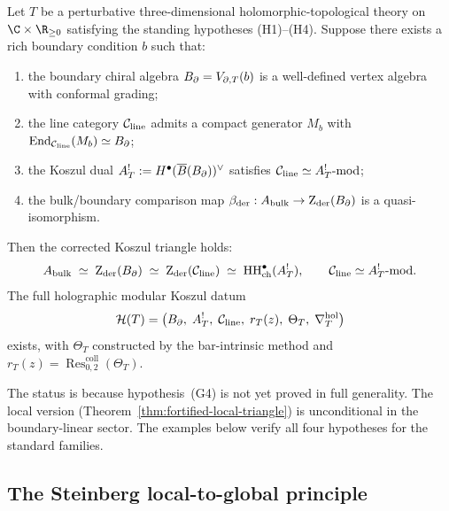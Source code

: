 \begin{conjecture}
Let $T$ be a perturbative three-dimensional holomorphic-topological
theory on $\C\times\R_{\ge 0}$ satisfying the standing hypotheses
\textup{(H1)--(H4)}. Suppose there exists a rich boundary
condition $b$ such that:
\begin{enumerate}[label=\textup{(G\arabic*)},leftmargin=2.2em]
\item the boundary chiral algebra $B_{\partial}=V_{\partial,T}(b)$ is
a well-defined vertex algebra with conformal grading;
\item the line category $\mathcal C_{\mathrm{line}}$ admits a compact
generator $M_b$ with $\operatorname{End}_{\mathcal C_{\mathrm{line}}}(M_b)\simeq B_{\partial}$;
\item the Koszul dual $A^!_T := H^\bullet(\overline{B}(B_{\partial}))^\vee$
satisfies $\mathcal C_{\mathrm{line}}\simeq A^!_T\text{-mod}$;
\item the bulk/boundary comparison map
$\beta_{\mathrm{der}}:A_{\mathrm{bulk}}\to\operatorname{Z}_{\mathrm{der}}(B_{\partial})$
is a quasi-isomorphism.
\end{enumerate}
Then the corrected Koszul triangle holds:
\begin{equation}%
\Abulk
\;\simeq\;
\Zder(\Bbound)
\;\simeq\;
\Zder(\cC_{\mathrm{line}})
\;\simeq\;
\HH^\bullet_{\mathrm{ch}}(A^!_T),
\qquad
\cC_{\mathrm{line}}\simeq A^!_T\text{-mod}.
\end{equation}
The full holographic modular Koszul datum
\[
\mathcal{H}(T)
= \bigl(
B_{\partial},\;A^!_T,\;\mathcal C_{\mathrm{line}},\;
r_T(z),\;\Theta_T,\;\nabla^{\mathrm{hol}}_T
\bigr)
\]
exists, with $\Theta_T$ constructed by the bar-intrinsic method
and $r_T(z)=\operatorname{Res}^{\mathrm{coll}}_{0,2}(\Theta_T)$.
\end{conjecture}

\begin{remark}
The status is \ClaimStatusConjectured{} because hypothesis~(G4)
is not yet proved in full generality. The local version
(Theorem~\ref{thm:fortified-local-triangle}) is unconditional in
the boundary-linear sector. The examples below verify all four
hypotheses for the standard families.
\end{remark}


\subsection{The Steinberg local-to-global principle}

